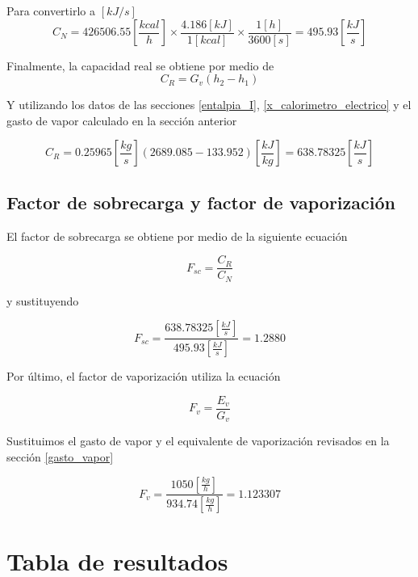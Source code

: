 \documentclass[12pt,letterpaper]{article}
\begin{document}
Para convertirlo a $[kJ/s]$ 
$$
    C_N = 426506.55\left[\frac{kcal}{h}\right]
    \times \frac{4.186[kJ]}{1[kcal]} \times \frac{1[h]}{3600[s]} = 495.93\left[\frac{kJ}{s}\right]
$$


Finalmente, la capacidad real se obtiene por medio de
\begin{equation}
    C_R = G_v(h_2 - h_1)
\end{equation}

Y utilizando los datos de las secciones \ref{entalpia_I}, \ref{x_calorimetro_electrico} y el
gasto de vapor calculado en la sección anterior

$$
    C_R = 0.25965\left[\frac{kg}{s}\right]
    (2689.085 - 133.952)\left[\frac{kJ}{kg}\right] = 638.78325 \left[\frac{kJ}{s}\right]
$$

\subsection{Factor de sobrecarga y factor de vaporización}

El factor de sobrecarga se obtiene por medio de la siguiente ecuación

\begin{equation}
    F_{sc} = \frac{C_R}{C_N} 
\end{equation}

y sustituyendo

$$
    F_{sc} = \frac{638.78325 \left[\frac{kJ}{s}\right]}
    {495.93\left[\frac{kJ}{s}\right]} = 1.2880
$$

Por último, el factor de vaporización utiliza la ecuación

\begin{equation}
    F_v = \frac{E_v}{G_v}
\end{equation}

Sustituimos el gasto de vapor y el equivalente de vaporización revisados en la sección \ref{gasto_vapor}

$$
    F_v = \frac{1050\left[\frac{kg}{h}\right]}{934.74\left[\frac{kg}{h}\right]} 
    = 1.123307
$$


\pagebreak

\section{Tabla de resultados}
\end{document}

